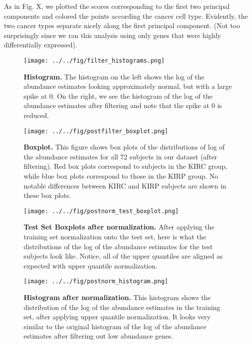  
As in Fig. X, we plotted the scores corresponding to the first two principal
components and colored the points according the cancer cell type. 
Evidently, the two cancer types separate nicely along the first
principal component. (Not too surprisingly since we ran this analysis using
only genes that were highly differentially expressed).  

\begin{figure}[H]
  \centering
    \texttt{[image: ../../fig/filter\_histograms.png]}
\caption{\textbf{Histogram.} The histogram on the left shows the log of the abundance estimates looking
  approximately normal, but with a large spike at 0.  On the right, we see the
  histogram of the log of the abundance estimates after filtering and note that the spike at 0 is
  reduced.}
   \label{fig:histogram}
\end{figure}


\begin{figure}[H]
  \centering
    \texttt{[image: ../../fig/postfilter\_boxplot.png]}
\caption{\textbf{Boxplot.} This figure shows box plots of the distributions of
  log of the abundance estimates for all 72 subjects in our dataset (after filtering). Red 	box
  plots correspond to subjects in the KIRC group, while blue box plots correspond
  to those in the KIRP group. No notable differences between KIRC and KIRP
  subjects are shown in these box plots.}
   \label{fig:boxplot}
\end{figure}


\begin{figure}[H]
  \centering
    \texttt{[image: ../../fig/postnorm\_test\_boxplot.png]}
\caption{\textbf{Test Set Boxplots after normalization.} After applying the training
  set normalization onto the test set, here is what the distributions of the
  log of the abundance estimates for the test subjects look like. Notice, all of the upper quantiles
  are aligned as expected with upper quantile normalization.}
   \label{fig:boxplotpost}
\end{figure}


\begin{figure}[H]
  \centering
    \texttt{[image: ../../fig/postnorm\_histogram.png]}
\caption{\textbf{Histogram after normalization.} This histogram shows the distribution
  of the log of the abundance estimates in the training set, after applying upper quantile
  normalization. It looks very similar to the original histogram of the
  log of the abundance estimates after filtering out low abundance genes.}
   \label{fig:histogram}
\end{figure}

